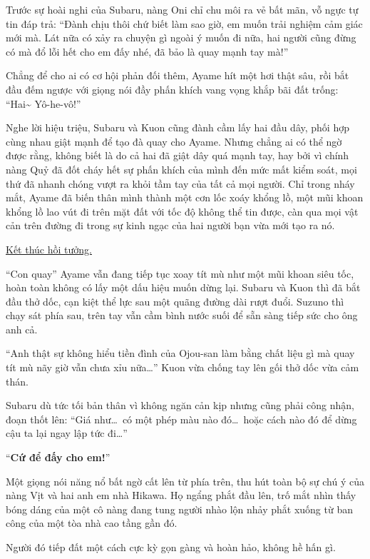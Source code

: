 \documentclass[../main.tex]{subfiles}
\begin{document}
Trước sự hoài nghi của Subaru, nàng Oni chỉ chu môi ra vẻ bất mãn, vỗ ngực tự tin đáp trả: ``Đành chịu thôi chứ biết làm sao giờ, em muốn trải nghiệm cảm giác mới mà. Lát nữa có xảy ra chuyện gì ngoài ý muốn đi nữa, hai người cũng đừng có mà đổ lỗi hết cho em đấy nhé, đã bảo là quay mạnh tay mà!''

Chẳng để cho ai có cơ hội phản đối thêm, Ayame hít một hơi thật sâu, rồi bắt đầu đếm ngược với giọng nói đầy phấn khích vang vọng khắp bãi đất trống: ``Hai\~{} Yô-he-vô!''

Nghe lời hiệu triệu, Subaru và Kuon cũng đành cầm lấy hai đầu dây, phối hợp cùng nhau giật mạnh để tạo đà quay cho Ayame. Nhưng chẳng ai có thể ngờ được rằng, không biết là do cả hai đã giật dây quá mạnh tay, hay bởi vì chính nàng Quỷ đã đốt cháy hết sự phấn khích của mình đến mức mất kiểm soát, mọi thứ đã nhanh chóng vượt ra khỏi tầm tay của tất cả mọi người. Chỉ trong nháy mắt, Ayame đã biến thân mình thành một cơn lốc xoáy khổng lồ, một mũi khoan khổng lồ lao vút đi trên mặt đất với tốc độ không thể tin được, càn qua mọi vật cản trên đường đi trong sự kinh ngạc của hai người bạn vừa mới tạo ra nó.

\begin{center}
    \uline{Kết thúc hồi tưởng.}
\end{center}

``Con quay'' Ayame vẫn đang tiếp tục xoay tít mù như một mũi khoan siêu tốc, hoàn toàn không có lấy một dấu hiệu muốn dừng lại. Subaru và Kuon thì đã bắt đầu thở dốc, cạn kiệt thể lực sau một quãng đường dài rượt đuổi. Suzuno thì chạy sát phía sau, trên tay vẫn cầm bình nước suối để sẵn sàng tiếp sức cho ông anh cả.

``Anh thật sự không hiểu tiền đình của Ojou-san làm bằng chất liệu gì mà quay tít mù nãy giờ vẫn chưa xỉu nữa\dots'' Kuon vừa chống tay lên gối thở dốc vừa cảm thán.

Subaru dù tức tối bản thân vì không ngăn cản kịp nhưng cũng phải công nhận, đoạn thốt lên: ``Giá như\dots\ có một phép màu nào đó\dots\ hoặc cách nào đó để dừng cậu ta lại ngay lập tức đi\dots''

``\textbf{Cứ để đấy cho em!}''

Một giọng nói năng nổ bất ngờ cất lên từ phía trên, thu hút toàn bộ sự chú ý của nàng Vịt và hai anh em nhà Hikawa. Họ ngẩng phắt đầu lên, trố mắt nhìn thấy bóng dáng của một cô nàng đang tung người nhào lộn nhảy phắt xuống từ ban công của một tòa nhà cao tầng gần đó.

Người đó tiếp đất một cách cực kỳ gọn gàng và hoàn hảo, không hề hấn gì.
\end{document}
